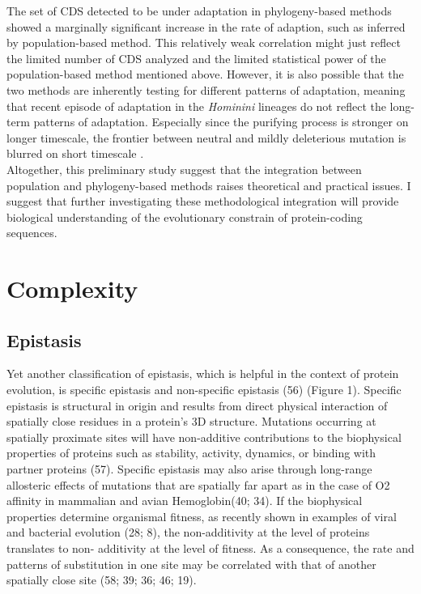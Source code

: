The set of CDS detected to be under adaptation in phylogeny-based methods showed a marginally significant increase in the rate of adaption, such as inferred by population-based method. This relatively weak correlation might just reflect the limited number of CDS analyzed and the limited statistical power of the population-based method mentioned above. However, it is also possible that the two methods are inherently testing for different patterns of adaptation, meaning that recent episode of adaptation in the \textit{Hominini} lineages do not reflect the long-term patterns of adaptation. Especially since the purifying process is stronger on longer timescale, the frontier between neutral and mildly deleterious mutation is blurred on short timescale \citet{ho_time_2005}. \\

Altogether, this preliminary study suggest that the integration between population and phylogeny-based methods raises theoretical and practical issues. I suggest that further investigating these methodological integration will provide biological understanding of the evolutionary constrain of protein-coding sequences. \\


\section{Complexity}

\subsection{Epistasis}

Yet another classification of epistasis, which is helpful in the context of protein evolution,
is specific epistasis and non-specific epistasis (56) (Figure 1). Specific epistasis is structural in origin and results from direct physical interaction of spatially close residues in a protein’s 3D structure. Mutations occurring at spatially proximate sites will have non-additive contributions to the biophysical properties of proteins such as stability, activity, dynamics, or binding with partner proteins (57). Specific epistasis may also arise through long-range allosteric effects of mutations that are spatially far apart as in the case of O2 affinity in mammalian and avian Hemoglobin(40; 34). If the biophysical properties determine organismal fitness, as recently shown in examples of viral and bacterial evolution (28; 8), the non-additivity at the level of proteins translates to non- additivity at the level of fitness. As a consequence, the rate and patterns of substitution in one site may be correlated with that of another spatially close site (58; 39; 36; 46; 19).

